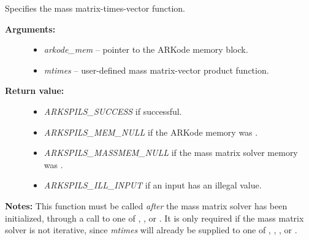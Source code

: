 \documentclass[letterpaper,10pt,english]{sphinxmanual}
\begin{document}
\begin{fulllineitems}
\label{c_interface/User_callable:c.ARKSpilsSetMassTimesVecFn}
Specifies the mass matrix-times-vector function.
\begin{description}
\item[{\textbf{Arguments:}}] \leavevmode\begin{itemize}
\item {} 
\emph{arkode\_mem} -- pointer to the ARKode memory block.

\item {} 
\emph{mtimes} -- user-defined mass matrix-vector product function.

\end{itemize}

\item[{\textbf{Return value:}}] \leavevmode\begin{itemize}
\item {} 
\emph{ARKSPILS\_SUCCESS} if successful.

\item {} 
\emph{ARKSPILS\_MEM\_NULL} if the ARKode memory was .

\item {} 
\emph{ARKSPILS\_MASSMEM\_NULL} if the mass matrix solver memory was .

\item {} 
\emph{ARKSPILS\_ILL\_INPUT} if an input has an illegal value.

\end{itemize}

\end{description}

\textbf{Notes:} This function must be called \emph{after} the mass matrix
solver has been initialized, through a call to one of
{\hyperref[c_interface/User_callable:c.ARKMassDense]{\emph{}}}, {\hyperref[c_interface/User_callable:c.ARKMassLapackDense]{\emph{}}},
{\hyperref[c_interface/User_callable:c.ARKMassBand]{\emph{}}} or {\hyperref[c_interface/User_callable:c.ARKMassLapackBand]{\emph{}}}.  It is
only required if the mass matrix solver is not iterative, since
\emph{mtimes} will already be supplied to one of
{\hyperref[c_interface/User_callable:c.ARKMassSpgmr]{\emph{}}}, {\hyperref[c_interface/User_callable:c.ARKMassSpbcg]{\emph{}}},
{\hyperref[c_interface/User_callable:c.ARKMassSptfqmr]{\emph{}}}, {\hyperref[c_interface/User_callable:c.ARKMassSpfgmr]{\emph{}}} or
{\hyperref[c_interface/User_callable:c.ARKMassPcg]{\emph{}}}.


\end{fulllineitems}
\end{document}
